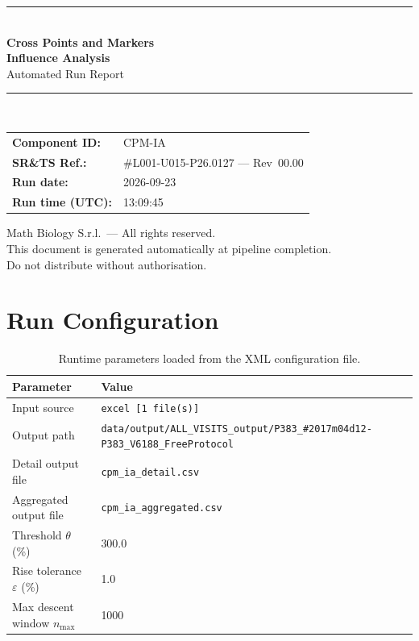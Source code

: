 \documentclass[a4paper,11pt]{article}
\begin{document}
\begin{titlepage}
\begin{center}
  \vspace*{1.8cm}
  {\color{dmaaccent}\rule{\linewidth}{1.5pt}}\\[0.6cm]
  {\LARGE\bfseries\color{dmaaccent}
    Cross Points and Markers\\[0.25cm]
    Influence Analysis}\\[0.4cm]
  {\Large Automated Run Report}\\[0.3cm]
  {\color{dmaaccent}\rule{\linewidth}{1.5pt}}\\[2cm]

  \begin{tabular}{ll}
    \textbf{Component ID:}   & CPM-IA \\[0.3cm]
    \textbf{SR\&TS Ref.:}    & \#L001-U015-P26.0127 --- Rev~00.00 \\[0.3cm]
    \textbf{Run date:}       & 2026-09-23 \\[0.3cm]
    \textbf{Run time (UTC):} & 13:09:45 \\
  \end{tabular}

  \vfill
  {\color{dmagray}\small
    Math Biology S.r.l.\ --- All rights reserved.\\
    This document is generated automatically at pipeline completion.\\
    Do not distribute without authorisation.}
\end{center}
\end{titlepage}

\tableofcontents
\clearpage

\section{Run Configuration}

\begin{table}[h!]
\centering
\small
\caption{Runtime parameters loaded from the XML configuration file.}
\begin{tabular}{ll}
\toprule
\textbf{Parameter} & \textbf{Value} \\
\midrule
Input source                      & \texttt{excel [1 file(s)]} \\
Output path                       & \texttt{data/output/ALL\_VISITS\_output/P383\_\#2017m04d12-P383\_V6188\_FreeProtocol} \\
Detail output file                & \texttt{cpm\_ia\_detail.csv} \\
Aggregated output file            & \texttt{cpm\_ia\_aggregated.csv} \\
Threshold $\theta$ (\%)           & 300.0 \\
Rise tolerance $\varepsilon$ (\%) & 1.0 \\
Max descent window $n_{\max}$     & 1000 \\
\bottomrule
\end{tabular}
\end{table}
\end{document}
